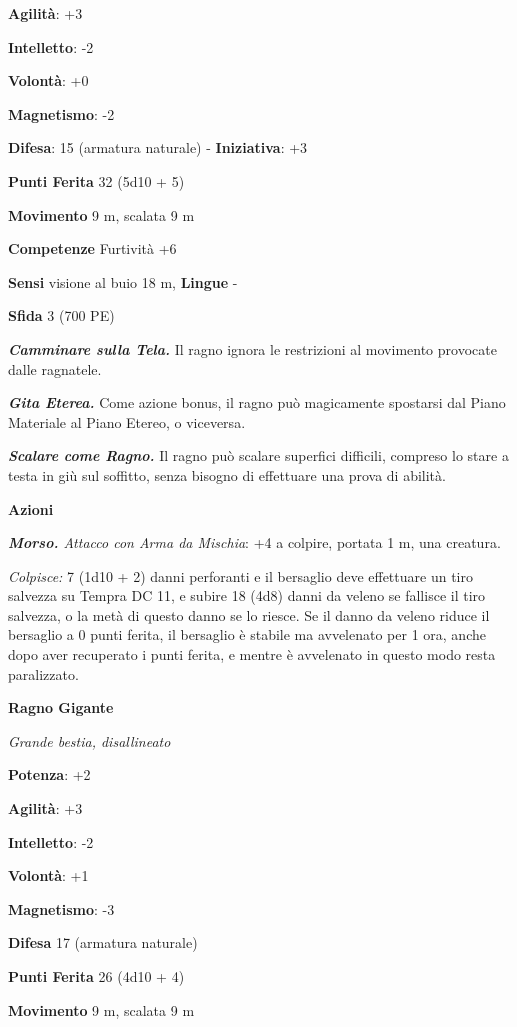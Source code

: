 \begin{multicols}{2}
\textbf{Agilità}: +3

\textbf{Intelletto}: -2

\textbf{Volontà}: +0

\textbf{Magnetismo}: -2

\textbf{Difesa}: 15 (armatura naturale) - \textbf{Iniziativa}: +3

\textbf{Punti Ferita} 32 (5d10 + 5)

\textbf{Movimento} 9 m, scalata 9 m

\textbf{Competenze} Furtività +6

\textbf{Sensi} visione al buio 18 m, 
\textbf{Lingue} -

\textbf{Sfida} 3 (700 PE)\smallskip

\emph{\textbf{Camminare sulla Tela.}} Il ragno ignora le restrizioni al
movimento provocate dalle ragnatele.

\emph{\textbf{Gita Eterea.}} Come azione bonus, il ragno può magicamente
spostarsi dal Piano Materiale al Piano Etereo, o viceversa.

\emph{\textbf{Scalare come Ragno.}} Il ragno può scalare superfici
difficili, compreso lo stare a testa in giù sul soffitto, senza bisogno
di effettuare una prova di abilità.

\smallskip\textbf{Azioni}

\emph{\textbf{Morso.} Attacco con Arma da Mischia}: +4 a colpire,
portata 1 m, una creatura.

\emph{Colpisce:} 7 (1d10 + 2) danni perforanti e il bersaglio deve
effettuare un tiro salvezza su Tempra DC 11, e subire 18 (4d8)
danni da veleno se fallisce il tiro salvezza, o la metà di questo danno
se lo riesce. Se il danno da veleno riduce il bersaglio a 0 punti
ferita, il bersaglio è stabile ma avvelenato per 1 ora, anche dopo aver
recuperato i punti ferita, e mentre è avvelenato in questo modo resta
paralizzato.

\textbf{Ragno Gigante}

\emph{Grande bestia, disallineato}

\textbf{Potenza}: +2

\textbf{Agilità}: +3

\textbf{Intelletto}: -2

\textbf{Volontà}: +1

\textbf{Magnetismo}: -3

\textbf{Difesa} 17 (armatura naturale)

\textbf{Punti Ferita} 26 (4d10 + 4)

\textbf{Movimento} 9 m, scalata 9 m


\end{multicols}
